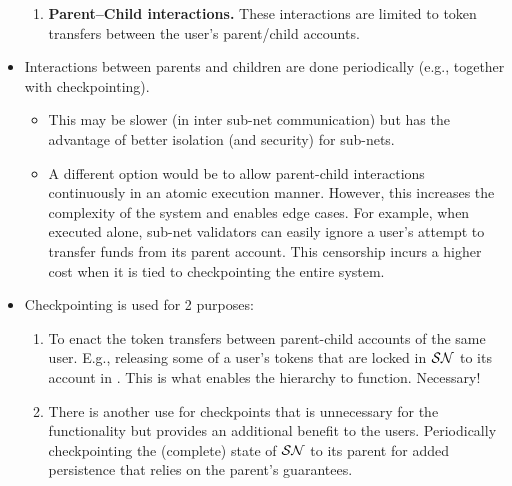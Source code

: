 \begin{itemize}
\begin{enumerate}
        \item \textbf{Parent--Child interactions.} These interactions are limited to token transfers between the user's parent/child accounts. 
    \end{enumerate}
    \item Interactions between parents and children are done periodically (e.g., together with checkpointing). 
    \begin{itemize}
        \item This may be slower (in inter sub-net communication) but has the advantage of better isolation (and security) for sub-nets.
        \item A different option would be to allow parent-child interactions continuously in an atomic execution manner. However, this increases the complexity of the system and enables edge cases. For example, when executed alone, sub-net validators can easily ignore a user's attempt to transfer funds from its parent account. This censorship incurs a higher cost when it is tied to checkpointing the entire system.
    \end{itemize}
    \item Checkpointing is used for 2 purposes:
    \begin{enumerate}
        \item To enact the token transfers between parent-child accounts of the same user. E.g., releasing some of a user's tokens that are locked in $\SN$ to its account in \parent{$\SN$}. This is what enables the hierarchy to function. Necessary!
        \item There is another use for checkpoints that is unnecessary for the \hc{} functionality but provides an additional benefit to the users. Periodically checkpointing the (complete) state of $\SN$ to its parent for added persistence that relies on the parent's guarantees. 

\end{enumerate}
\end{itemize}
